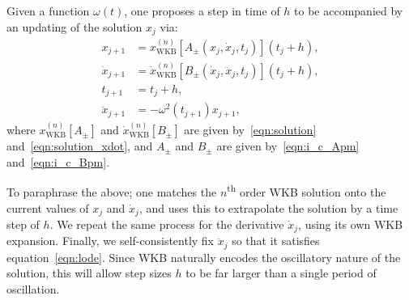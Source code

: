 Given a function \(\omega(t)\), one proposes a step in time of \(h\) to be accompanied by an updating of the solution \(x_j\) via:
\begin{align}
  x_{j+1} &= x_\mathrm{WKB}^{(n)}[A_\pm(x_j,\dot{x}_j,t_j)](t_j+h),
  \label{eqn:WKB_x_step} \\
  \dot{x}_{j+1} &= \dot{x}_\mathrm{WKB}^{(n)}[B_\pm(\dot{x}_j,\ddot{x}_j,t_j)](t_j+h),
  \label{eqn:WKB_xdot_step} \\
  t_{j+1} &= t_j+h,
  \label{eqn:WKB_t_step} \\
  \ddot{x}_{j+1} &= -\omega^2(t_{j+1})x_{j+1},
  \label{eqn:WKB_xddot} 
\end{align}
where \(x_\mathrm{WKB}^{(n)}[A_{\pm}]\) and \(\dot{x}_\mathrm{WKB}^{(n)}[B_{\pm}]\) are given by~\eqref{eqn:solution} and~\eqref{eqn:solution_xdot},  and \(A_{\pm}\) and \(B_{\pm}\)  are given by~\eqref{eqn:i_c_Apm} and~\eqref{eqn:i_c_Bpm}.

To paraphrase the above; one matches the \(n\)\textsuperscript{th} order WKB solution onto the current values of \(x_j\) and \(\dot{x}_j\), and uses this to extrapolate the solution by a time step of \(h\). We repeat the same process for the derivative \(\dot{x}_j\), using its own WKB expansion. Finally, we self-consistently fix \(\ddot{x}_j\) so that it satisfies equation~\eqref{eqn:lode}. Since WKB naturally encodes the oscillatory nature of the solution, this will allow step sizes \(h\) to be far larger than a single period of oscillation. 


